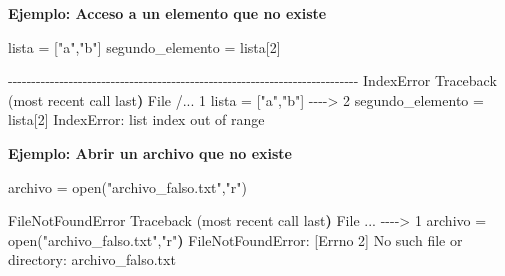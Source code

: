 \documentclass[
  letterpaper,
  DIV=11,
  numbers=noendperiod]{scrreprt}
\newenvironment{Shaded}{\begin{snugshade}}{\end{snugshade}}
\newcommand{\BuiltInTok}[1]{\textcolor[rgb]{0.00,0.23,0.31}{#1}}
\newcommand{\DecValTok}[1]{\textcolor[rgb]{0.68,0.00,0.00}{#1}}
\newcommand{\ErrorTok}[1]{\textcolor[rgb]{0.68,0.00,0.00}{#1}}
\newcommand{\ExtensionTok}[1]{\textcolor[rgb]{0.00,0.23,0.31}{#1}}
\newcommand{\KeywordTok}[1]{\textcolor[rgb]{0.00,0.23,0.31}{\textbf{#1}}}
\newcommand{\NormalTok}[1]{\textcolor[rgb]{0.00,0.23,0.31}{#1}}
\newcommand{\OperatorTok}[1]{\textcolor[rgb]{0.37,0.37,0.37}{#1}}
\newcommand{\PreprocessorTok}[1]{\textcolor[rgb]{0.68,0.00,0.00}{#1}}
\newcommand{\SpecialStringTok}[1]{\textcolor[rgb]{0.13,0.47,0.30}{#1}}
\newcommand{\StringTok}[1]{\textcolor[rgb]{0.13,0.47,0.30}{#1}}
\begin{document}
\textbf{Ejemplo: Acceso a un elemento que no existe}

\begin{Shaded}
\begin{Highlighting}[]
\NormalTok{lista }\OperatorTok{=}\NormalTok{ [}\StringTok{"a"}\NormalTok{,}\StringTok{"b"}\NormalTok{]}
\NormalTok{segundo\_elemento }\OperatorTok{=}\NormalTok{ lista[}\DecValTok{2}\NormalTok{]}
\end{Highlighting}
\end{Shaded}

\begin{Shaded}
\begin{Highlighting}[]
\ExtensionTok{{-}{-}{-}{-}{-}{-}{-}{-}{-}{-}{-}{-}{-}{-}{-}{-}{-}{-}{-}{-}{-}{-}{-}{-}{-}{-}{-}{-}{-}{-}{-}{-}{-}{-}{-}{-}{-}{-}{-}{-}{-}{-}{-}{-}{-}{-}{-}{-}{-}{-}{-}{-}{-}{-}{-}{-}{-}{-}{-}{-}{-}{-}{-}{-}{-}{-}{-}{-}{-}{-}{-}{-}{-}{-}{-}}
\ExtensionTok{IndexError}\NormalTok{                                Traceback }\ErrorTok{(}\ExtensionTok{most}\NormalTok{ recent call last}\KeywordTok{)}
\ExtensionTok{File}\NormalTok{ /...}
      \ExtensionTok{1}\NormalTok{ lista = }\PreprocessorTok{[}\StringTok{"a"}\SpecialStringTok{,}\StringTok{"b"}\PreprocessorTok{]}
\ExtensionTok{{-}{-}{-}{-}}\OperatorTok{\textgreater{}}\NormalTok{ 2 segundo\_elemento = lista}\PreprocessorTok{[}\SpecialStringTok{2}\PreprocessorTok{]}
\ExtensionTok{IndexError:}\NormalTok{ list index out of range}
\end{Highlighting}
\end{Shaded}

\textbf{Ejemplo: Abrir un archivo que no existe}

\begin{Shaded}
\begin{Highlighting}[]
\NormalTok{archivo }\OperatorTok{=} \BuiltInTok{open}\NormalTok{(}\StringTok{"archivo\_falso.txt"}\NormalTok{,}\StringTok{"r"}\NormalTok{)}
\end{Highlighting}
\end{Shaded}

\begin{Shaded}
\begin{Highlighting}[]
\ExtensionTok{FileNotFoundError}\NormalTok{                         Traceback }\ErrorTok{(}\ExtensionTok{most}\NormalTok{ recent call last}\KeywordTok{)}
\ExtensionTok{File}\NormalTok{ ...}
\ExtensionTok{{-}{-}{-}{-}}\OperatorTok{\textgreater{}}\NormalTok{ 1 archivo = open}\ErrorTok{(}\StringTok{"archivo\_falso.txt"}\ExtensionTok{,}\StringTok{"r"}\KeywordTok{)}
\ExtensionTok{FileNotFoundError:}\NormalTok{ [Errno 2] No such file or directory: }\StringTok{\textquotesingle{}archivo\_falso.txt\textquotesingle{}}
\end{Highlighting}
\end{Shaded}
\end{document}
